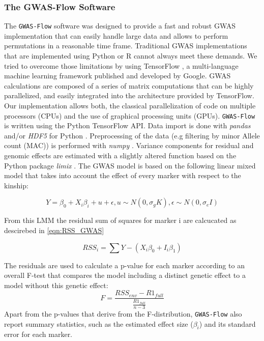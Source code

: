 \subsubsection{The GWAS-Flow Software}
The \texttt{GWAS-Flow} software was designed to provide a fast and robust GWAS implementation that can easily handle large
data and allows to perform permutations in a reasonable time frame. Traditional GWAS implementations that are implemented
using Python \cite{van1995python} or R \cite{R} cannot always meet these demands.
We tried to overcome those limitations by using TensorFlow \cite{tensorflow2015-whitepaper}, a multi-language machine
learning framework published and developed by Google. GWAS calculations are composed of a series of matrix computations
that can be highly parallelized, and easily integrated into the architecture provided by TensorFlow. Our implementation
allows both, the classical parallelization of code on multiple processors (CPUs) and the use of graphical processing units
(GPUs). \texttt{GWAS-Flow} is written using the Python TensorFlow API. 
Data import is done with \textit{pandas} \cite{mckinney-proc-scipy-2010} and/or \textit{HDF5} for Python \cite{hdf5_2014}.
Preprocessing of the data (e.g filtering by minor Allele count (MAC)) is performed with \textit{numpy} \cite{oliphant2006guide}.
Variance components for residual and genomic effects are estimated with a slightly altered function based on the Python package
\textit{limix} \cite{Lippert003905}. 
The GWAS model is based on the following linear mixed model that takes into account the effect of every marker with respect to
the kinship:

\begin{equation}
Y = \beta_{0} + X_i\beta_i + u + \epsilon, u \sim N(0,\sigma_gK), \epsilon \sim N(0,\sigma_e I )
\label{eqn:LMM GWAS}
\end{equation}

From  this LMM the residual sum of squares for marker i are calcucated as descirebed in \ref{eqn:RSS_GWAS}


\begin{equation}
RSS_{i} =  \sum{Y - (X_{i}\beta_{0}   + I_{i}\beta_{1})}
\label{eqn:RSS_GWAS}
\end{equation}




\noindent
The residuals are used to calculate a p-value for each marker according to an overall F-test that compares the model including a
distinct genetic effect to a model without this genetic effect: 
\begin{equation}
  F = \frac{RSS_{env} - R1_{full} }{\frac{R1_{full}}{n-3}}
  \label{F_test}
  \end{equation}
\noindent
Apart from the p-values that derive from the F-distribution, \texttt{GWAS-Flow} also report summary statistics, such as the estimated
effect size ($\beta_i$) and its standard error for each marker.
